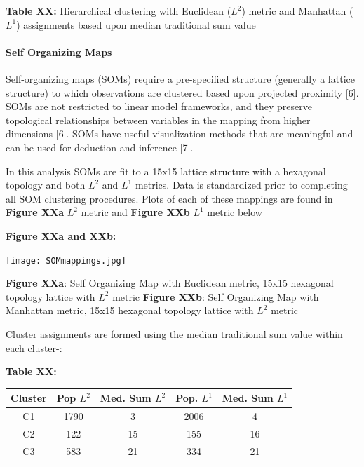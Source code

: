 \documentclass[12pt,]{article}
\let\oldparagraph\paragraph
\renewcommand{\paragraph}[1]{\oldparagraph{#1}\mbox{}}
\begin{document}
\textbf{Table XX:} Hierarchical clustering with Euclidean (\(L^{2}\))
metric and Manhattan (\(L^{1}\)) assignments based upon median
traditional sum value

\hypertarget{self-organizing-maps}{%
\paragraph{Self Organizing Maps}\label{self-organizing-maps}}

Self-organizing maps (SOMs) require a pre-specified structure (generally
a lattice structure) to which observations are clustered based upon
projected proximity {[}6{]}. SOMs are not restricted to linear model
frameworks, and they preserve topological relationships between
variables in the mapping from higher dimensions {[}6{]}. SOMs have
useful visualization methods that are meaningful and can be used for
deduction and inference {[}7{]}.

In this analysis SOMs are fit to a 15x15 lattice structure with a
hexagonal topology and both \(L^{2}\) and \(L^{1}\) metrics. Data is
standardized prior to completing all SOM clustering procedures. Plots of
each of these mappings are found in \textbf{Figure XXa} \(L^{2}\) metric
and \textbf{Figure XXb} \(L^{1}\) metric below

\textbf{Figure XXa and XXb:}

\begin{center}
\texttt{[image: SOMmappings.jpg]}
\end{center}

\textbf{Figure XXa}: Self Organizing Map with Euclidean metric, 15x15
hexagonal topology lattice with \(L^{2}\) metric \textbf{Figure XXb}:
Self Organizing Map with Manhattan metric, 15x15 hexagonal topology
lattice with \(L^{2}\) metric

Cluster assignments are formed using the median traditional sum value
within each cluster-:

\textbf{Table XX:}

\begin{center}
\begin{tabular}{|c|c|c|c|c|}
\hline
Cluster &  Pop $L^{2}$ & Med. Sum  $L^{2}$ & Pop. $L^{1}$ & Med. Sum $L^{1}$\\
\hline
\hline
C1 & 1790 & 3 & 2006 & 4\\
\hline
C2 & 122 & 15 & 155 & 16 \\
\hline
C3 & 583 & 21 & 334 & 21 \\
\hline
\end{tabular}
\end{center}
\end{document}
